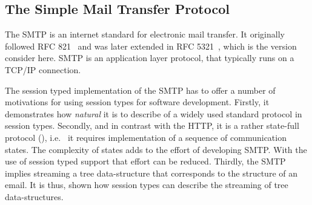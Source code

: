 
\subsection{The Simple Mail Transfer Protocol}
\label{sec:smtp}

The SMTP is an internet standard for electronic
mail transfer. It originally followed
RFC 821~\cite{SMTP-rfc} and was later extended
in RFC 5321~\cite{ESMTP-rfc}, which is the version consider here.
SMTP is an application layer protocol, that typically runs on
a TCP/IP connection.

The session typed implementation of the SMTP has to offer
a number of motivations for using session types for software
development.
Firstly, it demonstrates how {\em natural} it is
to describe of a widely used standard protocol in session types.
Secondly, and in contrast with the HTTP, it is
a rather state-full protocol (),
i.e.~ it requires implementation of a sequence of communication states.
The complexity of states adds to the effort of
developing SMTP. With the use of session typed
support that effort can be reduced.
Thirdly, the SMTP implies streaming a tree
data-structure that corresponds to the structure
of an email.
It is thus, shown how session types can describe
the streaming of tree data-structures.


%
%


